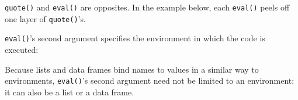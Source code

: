 \texttt{quote()} and \texttt{eval()} are opposites. In the example
below, each \texttt{eval()} peels off one layer of \texttt{quote()}'s.

\begin{Shaded}
\begin{Highlighting}[]
\NormalTok{(} \NormalTok{+}\StringTok{ }\NormalTok{)}
\NormalTok{(}\NormalTok{(} \NormalTok{+}\StringTok{ }\NormalTok{))}

\NormalTok{(}\NormalTok{(} \NormalTok{+}\StringTok{ }\NormalTok{))}
\NormalTok{(}\NormalTok{(}\NormalTok{(} \NormalTok{+}\StringTok{ }\NormalTok{)))}
\NormalTok{(}\NormalTok{(}\NormalTok{(}\NormalTok{(} \NormalTok{+}\StringTok{ }\NormalTok{))))}
\end{Highlighting}
\end{Shaded}

\texttt{eval()}'s second argument specifies the environment in which the
code is executed:

\begin{Shaded}
\begin{Highlighting}[]
\StringTok{ }
\NormalTok{(}

\StringTok{ }\NormalTok{()}
\StringTok{ }
\NormalTok{(}
\end{Highlighting}
\end{Shaded}

Because lists and data frames bind names to values in a similar way to
environments, \texttt{eval()}'s second argument need not be limited to
an environment: it can also be a list or a data frame.

\begin{Shaded}
\begin{Highlighting}[]
\NormalTok{(}\NormalTok{(} \NormalTok{))}
\NormalTok{(}\NormalTok{(} \NormalTok{))}
\end{Highlighting}
\end{Shaded}

